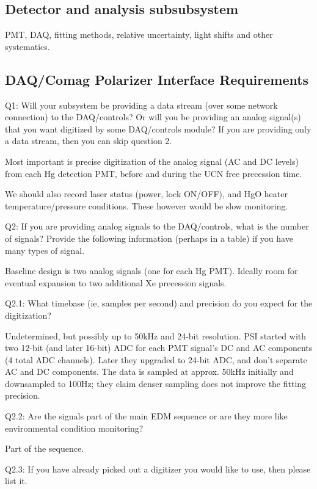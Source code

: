 \documentclass[11pt]{article}
\begin{document}
\subsection{Detector and analysis subsubsystem}
PMT, DAQ, fitting methods, relative uncertainty, light shifts and other systematics.

\subsection{DAQ/Comag Polarizer Interface Requirements}

Q1: Will your subsystem be providing a data stream (over some network connection) to the DAQ/controls?  Or will you be providing an analog signal(s) that you want digitized by some DAQ/controls module? 
If you are providing only a data stream, then you can skip question 2.

Most important is precise digitization of the analog signal (AC and DC levels) from each Hg detection PMT, before and during the UCN free precession time.

We should also record laser status (power, lock ON/OFF), and HgO heater temperature/pressure conditions.  These however would be slow monitoring.

Q2: If you are providing analog signals to the DAQ/controls, what is the number of signals?  Provide the following information (perhaps in a table) if you have many types of signal.

Baseline design is two analog signals (one for each Hg PMT).  Ideally room for eventual expansion to two additional Xe precession signals.

Q2.1: What timebase (ie, samples per second) and precision do you expect for the digitization?

Undetermined, but possibly up to 50kHz and 24-bit resolution.  PSI started with two 12-bit (and later 16-bit) ADC for each PMT signal's DC and AC components (4 total ADC channels).  Later they upgraded to 24-bit ADC, and don't separate AC and DC components.  The data is sampled at approx. 50kHz initially and downsampled to 100Hz; they claim denser sampling does not improve the fitting precision.

Q2.2: Are the signals part of the main EDM sequence or are they more like environmental condition monitoring?  

Part of the sequence.

Q2.3: If you have already picked out a digitizer you would like to use, then please list it.
\end{document}
